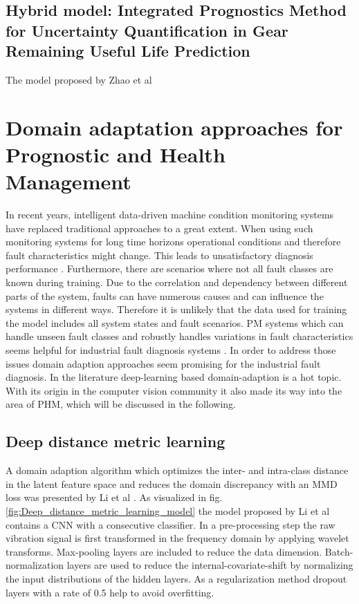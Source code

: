 \subsection{Hybrid model: Integrated Prognostics Method for Uncertainty Quantification in Gear Remaining Useful Life Prediction}

The model proposed by Zhao et al 


\section{Domain adaptation approaches for Prognostic and Health Management}
In recent years, intelligent data-driven machine condition monitoring systems have replaced traditional approaches to a great extent. When using such monitoring systems for long time horizons operational conditions and therefore fault characteristics might change. This leads to unsatisfactory diagnosis performance \cite{AZAMFAR2020103932}. Furthermore, there are scenarios where not all fault classes are known during training. Due to the correlation and dependency between different parts of the system, faults can have numerous causes and can influence the systems in different ways. Therefore it is unlikely that the data used for training the model includes all system states and fault scenarios. PM systems which can handle unseen fault classes and robustly handles variations in fault characteristics seems helpful for industrial fault diagnosis systems \cite{Michau2017}. In order to address those issues domain adaption approaches seem promising for the industrial fault diagnosis. In the literature deep-learning based domain-adaption is a hot topic. With its origin in the computer vision community it also made its way into the area of PHM, which will be discussed in the following. 

\subsection{Deep distance metric learning}
A domain adaption algorithm which optimizes the inter- and intra-class distance in the latent feature space and reduces the domain discrepancy with an MMD loss was presented by Li et al \cite{Li2018}. As visualized in fig. \ref{fig:Deep_distance_metric_learning_model} the model proposed by Li et al contains a CNN with a consecutive classifier. In a pre-processing step the raw vibration signal is first transformed in the frequency domain by applying wavelet transforms. Max-pooling layers are included to reduce the data dimension. Batch-normalization layers are used to reduce the internal-covariate-shift by normalizing the input distributions of the hidden layers. As a regularization method dropout layers with a rate of 0.5 help to avoid overfitting. 

